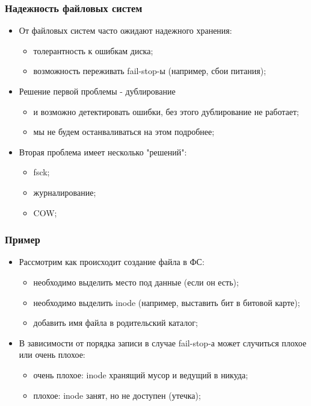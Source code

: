 \begin{frame}
\frametitle{Надежность файловых систем}
\begin{itemize}
  \item<1-> От файловых систем часто ожидают надежного хранения:
    \begin{itemize}
      \item толерантность к ошибкам диска;
      \item возможность переживать fail-stop-ы (например, сбои питания);
    \end{itemize}
  \item<2-> Решение первой проблемы - дублирование
    \begin{itemize}
      \item и возможно детектировать ошибки, без этого дублирование не работает;
      \item мы не будем останваливаться на этом подробнее;
    \end{itemize}
  \item<3-> Вторая проблема имеет несколько "решений":
    \begin{itemize}
      \item fsck;
      \item журналирование;
      \item COW;
    \end{itemize}
\end{itemize}
\end{frame}

\begin{frame}
\frametitle{Пример}
\begin{itemize}
  \item<1-> Рассмотрим как происходит создание файла в ФС:
    \begin{itemize}
      \item необходимо выделить место под данные (если он есть);
      \item необходимо выделить inode (например, выставить бит в битовой карте);
      \item добавить имя файла в родительский каталог;
    \end{itemize}
  \item<2-> В зависимости от порядка записи в случае fail-stop-а может случиться плохое или очень плохое:
    \begin{itemize}
      \item очень плохое: inode хранящий мусор и ведущий в никуда;
      \item плохое: inode занят, но не доступен (утечка);
    \end{itemize}
\end{itemize}
\end{frame}

